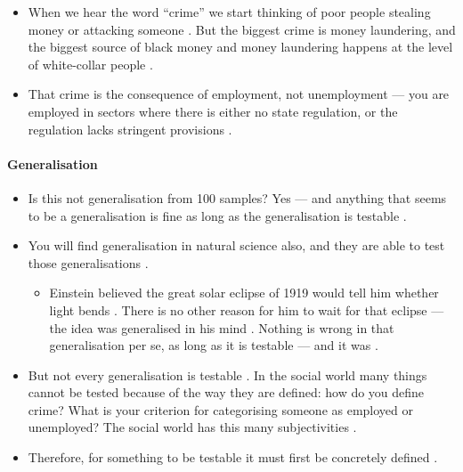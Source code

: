 \begin{KeyConcept}
\begin{itemize}
    \item When we hear the word ``crime'' we start thinking of poor people stealing money or attacking someone . But the biggest crime is money laundering, and the biggest source of black money and money laundering happens at the level of white-collar people .
    \item That crime is the consequence of employment, not unemployment --- you are employed in sectors where there is either no state regulation, or the regulation lacks stringent provisions .
\end{itemize}
\end{KeyConcept}

\paragraph{Generalisation}
\begin{itemize}
    \item Is this not generalisation from 100 samples? Yes --- and anything that seems to be a generalisation is fine as long as the generalisation is testable .
    \item You will find generalisation in natural science also, and they are able to test those generalisations .
    \begin{itemize}
        \item Einstein believed the great solar eclipse of 1919 would tell him whether light bends . There is no other reason for him to wait for that eclipse --- the idea was generalised in his mind . Nothing is wrong in that generalisation per se, as long as it is testable --- and it was .
    \end{itemize}
    \item But not every generalisation is testable . In the social world many things cannot be tested because of the way they are defined: how do you define crime? What is your criterion for categorising someone as employed or unemployed? The social world has this many subjectivities .
    \item Therefore, for something to be testable it must first be concretely defined .
\end{itemize}

